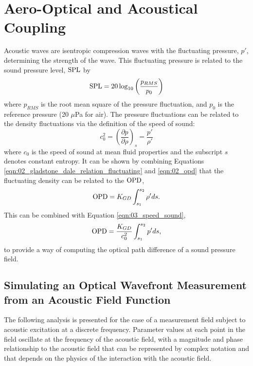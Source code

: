
\chapter{Aero-Optical and Acoustical Coupling}
\label{chap:03_optical_acoustics}


Acoustic waves are isentropic compression waves with the fluctuating pressure, $p'$, determining the strength of the wave.
This fluctuating pressure is related to the sound pressure level, $\operatorname{SPL}$ by
\begin{equation}
  \operatorname{SPL} = 20\log_{10}\left(\frac{p_{RMS}}{p_0}\right)
  \label{eqn:03_spl}
\end{equation}
where $p_{RMS}$ is the root mean square of the pressure fluctuation, and $p_0$ is the reference pressure (20 $\mu$Pa for air).
The pressure fluctuations can be related to the density fluctuations via the definition of the speed of sound:
\begin{equation}
  c_0^2 = \left(\frac{\partial p}{\partial \rho}\right)_s=\frac{p'}{\rho'}
  \label{eqn:03_speed_sound}
\end{equation}
where $c_0$ is the speed of sound at mean fluid properties and the subscript $s$ denotes constant entropy.
It can be shown by combining Equations \ref{eqn:02_gladstone_dale_relation_fluctuating} and \ref{eqn:02_opd} that the fluctuating density can be related to the $\operatorname{OPD}$,
\begin{equation}
  \operatorname{OPD} = K_{GD}\int_{s_1}^{s_2}{\rho'}ds \textrm{.}
  \label{eqn:03_opd_fluct}
\end{equation}
This can be combined with Equation \ref{eqn:03_speed_sound},
\begin{equation}
  \operatorname{OPD} = \frac{K_{GD}}{c_0^2}\int_{s_1}^{s_2}{p'}ds \textrm{,}
  \label{eqn:03_opd_pressure}
\end{equation}
to provide a way of computing the optical path difference of a sound pressure field.

\section{Simulating an Optical Wavefront Measurement from an Acoustic Field Function}
\label{sect:03_simulated_beam}
The following analysis is presented for the case of a measurement field subject to acoustic excitation at a discrete frequency. Parameter values at each point in the field oscillate at the frequency of the acoustic field, with a magnitude and phase relationship to the acoustic field that can be represented by complex notation and that depends on the physics of the interaction with the acoustic field.

